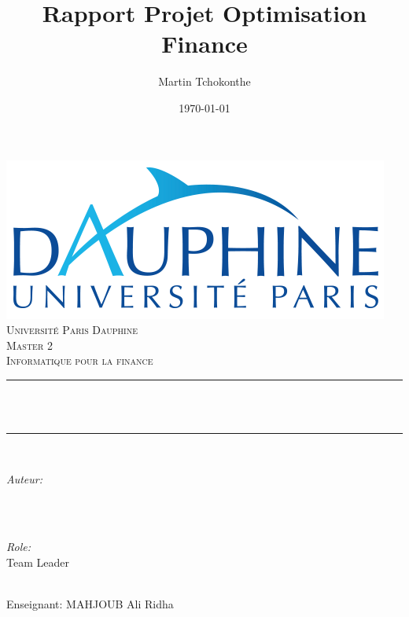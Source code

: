 \documentclass[12pt]{article}
\title{Rapport Projet Optimisation Finance}
\author{Martin Tchokonthe}
\date{\today}
\makeatletter
\theoremstyle{definition}
\theoremstyle{definition}
\newcommand{\role}{Team Leader}
\newcommand{\faculty}{MAHJOUB Ali Ridha}
\let\thetitle\@title
\let\theauthor\@author
\let\thedate\@date
\makeatother
\begin{document}
\begin{titlepage}
	\centering
    \includegraphics[scale = 0.4]{dauphine.png}\\[1.0 cm]
    \textsc{\LARGE Université Paris Dauphine}\\[1.0 cm]	
	\textsc{\Large Master 2 }\\[0.5 cm]
	\textsc{\large Informatique pour la finance}\\[0.5 cm]
	\rule{\linewidth}{0.2 mm} \\[0.4 cm]
	{ \huge \bfseries \thetitle}\\
	\rule{\linewidth}{0.2 mm} \\[1.5 cm]
	
	\begin{minipage}{0.4\textwidth}
		\begin{flushleft} \large
			\emph{Auteur:}\\
			\theauthor \ \\
			\end{flushleft}
			\end{minipage}~
			\begin{minipage}{0.4\textwidth}
			\begin{flushright} \large
			\emph{Role:} \\
			\role
		\end{flushright}
	\end{minipage}\\[1 cm]
	{\large Enseignant: \faculty}\\[1 cm]
 
	\vfill
	
\end{titlepage}


\tableofcontents
\pagebreak
\end{document}
